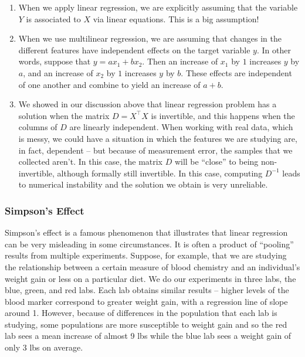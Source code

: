 \documentclass[
]{article}
\begin{document}
\begin{enumerate}
\def\labelenumi{\arabic{enumi}.}
\item
  When we apply linear regression, we are explicitly assuming that the
  variable \(Y\) is associated to \(X\) via linear equations. This is a
  big assumption!
\item
  When we use multilinear regression, we are assuming that changes in
  the different features have independent effects on the target variable
  \(y\). In other words, suppose that \(y=ax_1+bx_2\). Then an increase
  of \(x_1\) by \(1\) increases \(y\) by \(a\), and an increase of
  \(x_2\) by \(1\) increases \(y\) by \(b\). These effects are
  independent of one another and combine to yield an increase of
  \(a+b\).
\item
  We showed in our discussion above that linear regression problem has a
  solution when the matrix \(D=X^{\intercal}X\) is invertible, and this
  happens when the columns of \(D\) are linearly independent. When
  working with real data, which is messy, we could have a situation in
  which the features we are studying are, in fact, dependent -- but
  because of measurement error, the samples that we collected aren't. In
  this case, the matrix \(D\) will be ``close'' to being non-invertible,
  although formally still invertible. In this case, computing \(D^{-1}\)
  leads to numerical instability and the solution we obtain is very
  unreliable.
\end{enumerate}

\hypertarget{simpsons-effect}{%
\subsubsection{Simpson's Effect}\label{simpsons-effect}}

Simpson's effect is a famous phenomenon that illustrates that linear
regression can be very misleading in some circumstances. It is often a
product of ``pooling'' results from multiple experiments. Suppose, for
example, that we are studying the relationship between a certain measure
of blood chemistry and an individual's weight gain or less on a
particular diet. We do our experiments in three labs, the blue, green,
and red labs. Each lab obtains similar results -- higher levels of the
blood marker correspond to greater weight gain, with a regression line
of slope around 1. However, because of differences in the population
that each lab is studying, some populations are more susceptible to
weight gain and so the red lab sees a mean increase of almost 9 lbs
while the blue lab sees a weight gain of only 3 lbs on average.
\end{document}
